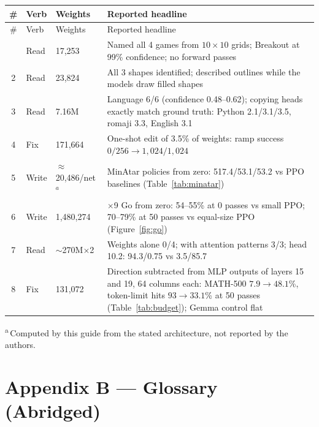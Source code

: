 \documentclass[11pt,a4paper]{article}
\begin{document}
\begin{longtable}{@{}c l l >{\raggedright\arraybackslash}p{7.1cm}@{}}
\toprule
\# & Verb & Weights & Reported headline \\
\midrule
\endfirsthead
\toprule
\# & Verb & Weights & Reported headline \\
\midrule
\endhead
\bottomrule
\endfoot
1 & Read & 17{,}253 & Named all 4 games from $10{\times}10$ grids; Breakout at 99\% confidence; no forward passes \\
2 & Read & 23{,}824 & All 3 shapes identified; described outlines while the models draw filled shapes \\
3 & Read & 7.16M & Language 6/6 (confidence 0.48--0.62); copying heads exactly match ground truth: Python 2.1/3.1/3.5, romaji 3.3, English 3.1 \\
4 & Fix & 171{,}664 & One-shot edit of 3.5\% of weights: ramp success $0/256 \to 1{,}024/1{,}024$ \\
5 & Write & $\approx$20{,}486/net$^{a}$ & MinAtar policies from zero: 517.4/53.1/53.2 vs PPO baselines (Table~\ref{tab:minatar}) \\
6 & Write & 1{,}480{,}274 & 9$\times$9 Go from zero: 54--55\% at 0 passes vs small PPO; 70--79\% at 50 passes vs equal-size PPO (Figure~\ref{fig:go}) \\
7 & Read & $\sim$270M$\times$2 & Weights alone 0/4; with attention patterns 3/3; head 10.2: 94.3/0.75 vs 3.5/85.7 \\
8 & Fix & 131{,}072 & Direction subtracted from MLP outputs of layers 15 and 19, 64 columns each: MATH-500 $7.9 \to 48.1$\%, token-limit hits $93 \to 33.1$\% at 50 passes (Table~\ref{tab:budget}); Gemma control flat \\
\end{longtable}

\noindent\small\textsuperscript{a}\,Computed by this guide from the stated architecture, not reported by the authors.

\section{Appendix B --- Glossary (Abridged)}\label{app:glossary}
\end{document}
